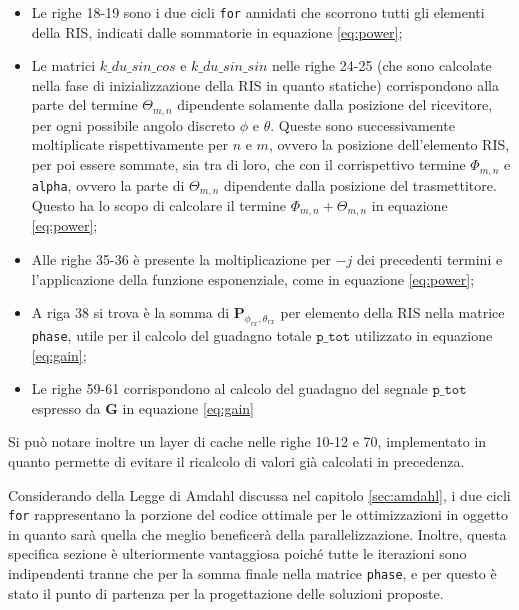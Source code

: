 \begin{itemize}
  \item Le righe 18-19 sono i due cicli \texttt{for} annidati che scorrono tutti
    gli elementi della RIS, indicati dalle sommatorie in equazione \ref{eq:power};

  \item Le matrici $k\_du\_sin\_cos$ e $k\_du\_sin\_sin$ nelle righe 24-25 (che
    sono calcolate nella fase di inizializzazione della RIS in quanto statiche) corrispondono
    alla parte del termine $\Theta_{m,n}$ dipendente solamente dalla posizione del
    ricevitore, per ogni possibile angolo discreto $\phi$ e $\theta$. Queste sono
    successivamente moltiplicate rispettivamente per $n$ e $m$, ovvero la
    posizione dell'elemento RIS, per poi essere sommate, sia tra di loro, che con
    il corrispettivo termine $\Phi_{m,n}$ e \texttt{alpha}, ovvero la parte di $\Theta
    _{m,n}$ dipendente dalla posizione del trasmettitore. Questo ha lo scopo di
    calcolare il termine $\Phi_{m,n}+\Theta_{m,n}$ in equazione \ref{eq:power};

  \item Alle righe 35-36 è presente la moltiplicazione per $-j$ dei precedenti termini
    e l'applicazione della funzione esponenziale, come in equazione
    \ref{eq:power};

  \item A riga 38 si trova è la somma di $\textbf{P}_{\phi_{rx},\theta_{rx}}$ per
    elemento della RIS nella matrice \texttt{phase}, utile per il calcolo del guadagno
    totale $\texttt{p\_tot}$ utilizzato in equazione \ref{eq:gain};

  \item Le righe 59-61 corrispondono al calcolo del guadagno del segnale $\texttt
    {p\_tot}$ espresso da $\textbf{G}$ in equazione \ref{eq:gain}
\end{itemize}

Si può notare inoltre un layer di cache nelle righe 10-12 e 70, implementato in
quanto permette di evitare il ricalcolo di valori già calcolati in precedenza.

Considerando della Legge di Amdahl discussa nel capitolo \ref{sec:amdahl}, i due
cicli \texttt{for} rappresentano la porzione del codice ottimale per le
ottimizzazioni in oggetto in quanto sarà quella che meglio beneficerà della
parallelizzazione. Inoltre, questa specifica sezione è ulteriormente vantaggiosa
poiché tutte le iterazioni sono indipendenti tranne che per la somma finale
nella matrice \texttt{phase}, e per questo è stato il punto di partenza per la
progettazione delle soluzioni proposte.

